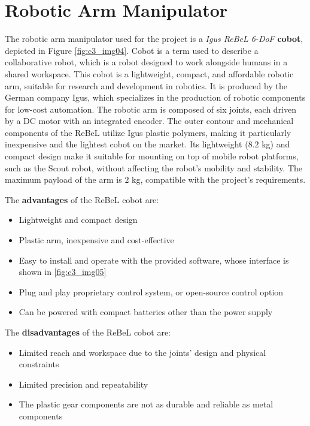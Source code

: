 \section{Robotic Arm Manipulator}

The robotic arm manipulator used for the project is a \textit{Igus ReBeL 6-DoF} \textbf{cobot}, 
depicted in Figure \ref{fig:c3_img04}.
Cobot is a term used to describe a collaborative robot, which is a robot designed to work alongside humans in a shared workspace.
This cobot is a lightweight, compact, and affordable robotic arm, suitable for research and development
in robotics. It is produced by the German company Igus, which specializes in the production of robotic components
for low-cost automation. The robotic arm is composed of six joints, each driven by a DC motor with an integrated encoder.
The outer contour and mechanical components of the ReBeL utilize Igus plastic polymers, making it particularly inexpensive
and the lightest cobot on the market. Its lightweight ($8.2$ kg) and compact design make it suitable for mounting on top
of mobile robot platforms, such as the Scout robot, without affecting the robot's mobility and stability.
The maximum payload of the arm is $2$ kg, compatible with the project's requirements.

The \textbf{advantages} of the ReBeL cobot are:

\begin{itemize}
    \item Lightweight and compact design
    \item Plastic arm, inexpensive and cost-effective
    \item Easy to install and operate with the provided software, whose interface is shown in \ref{fig:c3_img05}
    \item Plug and play proprietary control system, or open-source control option
    \item Can be powered with compact batteries other than the power supply
\end{itemize}

The \textbf{disadvantages} of the ReBeL cobot are:
\begin{itemize}
    \item Limited reach and workspace due to the joints' design and physical constraints
    \item Limited precision and repeatability
    \item The plastic gear components are not as durable and reliable as metal components
\end{itemize}

